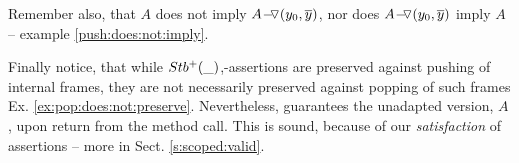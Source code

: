 Remember also, that $A$ does not imply $ \PushASLong {(y_0, \overline y)} {A}$, nor does $ \PushASLong {(y_0, \overline y)}{A}$  imply $A$ -- \cf example \ref{push:does:not:imply}.


Finally notice, that while $\Pos{\_}$,-assertions are preserved against pushing of internal frames, they are not necessarily preserved against popping of such frames \cf Ex. \ref{ex:pop:does:not:preserve}.
Nevertheless, {} guarantees the unadapted version, $A$, 
upon return from the method call. 
This is sound, because of our %
 \emph{\scoped satisfaction} of assertions -- more in Sect.  \ref{s:scoped:valid}.
 




%
%
%

